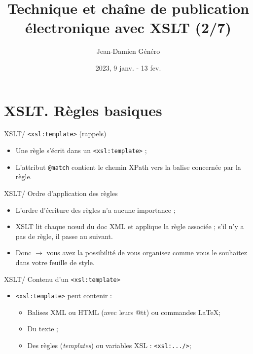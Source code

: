 \documentclass{beamer}
\title{Technique et chaîne de publication électronique avec XSLT (2/7)}
\date{2023, 9 janv. - 13 fev.}
\author{Jean-Damien Généro}
\institute{École nationale des chartes -- M2 TNAH}
\begin{document}
  \maketitle

  \section{XSLT. Règles basiques}

    \begin{frame}{XSLT/ \texttt{<xsl:template>} (rappels)}
    \Large
        \begin{itemize}
            \item Une règle s'écrit dans un \texttt{<xsl:template>} ;
            \bigskip
            \item L'attribut \texttt{@match} contient le chemin XPath vers la balise concernée par la règle.
        \end{itemize}
    \end{frame}
    
  \begin{frame}[fragile]{XSLT/ Ordre d'application des règles}
    \Large
        \begin{itemize}
            \item L'ordre d'écriture des règles n'a aucune importance ;
            \item XSLT lit chaque n\oe ud du doc XML et applique la règle associée ; s'il n'y a pas de règle, il passe au suivant.
            \item Donc  $\rightarrow$ vous avez la possibilité de vous organisez comme vous le souhaitez dans votre feuille de style.
        \end{itemize}
    \end{frame}

     \begin{frame}{XSLT/ Contenu d'un \texttt{<xsl:template>}}
         \Large
         \begin{itemize}
             \item \texttt{<xsl:template>} peut contenir :
             \begin{itemize}
             \Large
                 \item Balises XML ou HTML (avec leurs @tt) ou commandes \LaTeX ;
                 \item Du texte ;
                 \item Des règles (\textit{templates}) ou variables XSL : \texttt{<xsl:.../>};
             \end{itemize}
         \end{itemize}
     \end{frame}
\end{document}
